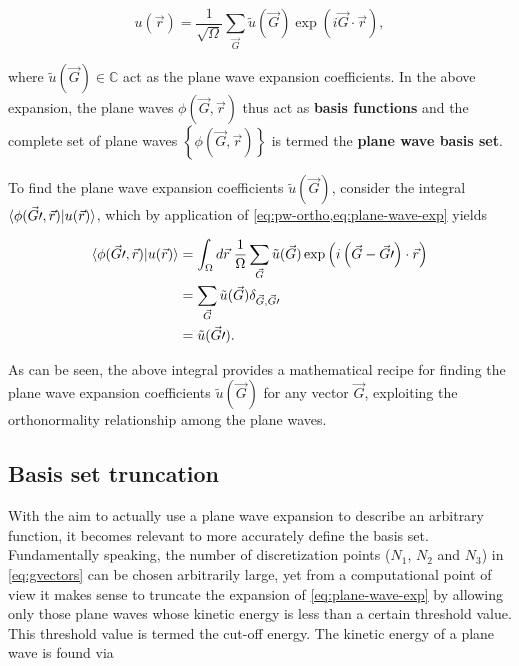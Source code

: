\begin{equation}
    u(\vec{r}) = \frac{1}{\sqrt{\Omega}} \sum_{\vec{G}} \tilde{u}(\vec{G}) \exp \left(i \vec{G} \cdot \vec{r} \right), \label{eq:plane-wave-exp}
\end{equation}

where $\tilde{u}(\vec{G}) \in \mathbb{C}$ act as the plane wave expansion coefficients. In the above expansion, the plane waves $\phi(\vec{G},\vec{r})$ thus act as \textbf{basis functions} and the complete set of plane waves $\left\{ \phi(\vec{G},\vec{r}) \right\}$ is termed the \textbf{plane wave basis set}.

To find the plane wave expansion coefficients $\tilde{u}(\vec{G})$, consider the integral $\braket{\phi(\vec{G}\prime,\vec{r}) | u(\vec{r})}$, which by application of \cref{eq:pw-ortho,eq:plane-wave-exp} yields

\begin{align}
    \braket{\phi(\vec{G}\prime,\vec{r}) | u(\vec{r})} &= \int_{\Omega} d\vec{r} \; \frac{1}{\Omega} \sum_{\vec{G}} \tilde{u}(\vec{G}) \exp \left(i \left(\vec{G} - \vec{G}\prime\right) \cdot \vec{r} \right) \label{eq:pwcoeff-int} \\
    &= \sum_{\vec{G}} \tilde{u}(\vec{G}) \delta_{\vec{G},\vec{G}\prime} \\
    &= \tilde{u}(\vec{G}\prime).
\end{align}

As can be seen, the above integral provides a mathematical recipe for finding the plane wave expansion coefficients $\tilde{u}(\vec{G})$ for any vector $\vec{G}$, exploiting the orthonormality relationship among the plane waves.

%
%
%
\subsection{Basis set truncation}

With the aim to actually use a plane wave expansion to describe an arbitrary function, it becomes relevant to more accurately define the basis set. Fundamentally speaking, the number of discretization points ($N_{1}$, $N_{2}$ and $N_{3}$) in \cref{eq:gvectors} can be chosen arbitrarily large, yet from a computational point of view it makes sense to truncate the expansion of \cref{eq:plane-wave-exp} by allowing only those plane waves whose kinetic energy is less than a certain threshold value. This threshold value is termed the cut-off energy. The kinetic energy of a plane wave is found via

